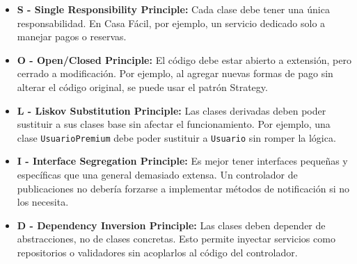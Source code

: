 		\begin{itemize}
			\item \textbf{S - Single Responsibility Principle:} Cada clase debe tener una única responsabilidad. En Casa Fácil, por ejemplo, un servicio dedicado solo a manejar pagos o reservas.
			
			\item \textbf{O - Open/Closed Principle:} El código debe estar abierto a extensión, pero cerrado a modificación. Por ejemplo, al agregar nuevas formas de pago sin alterar el código original, se puede usar el patrón Strategy.
			
			\item \textbf{L - Liskov Substitution Principle:} Las clases derivadas deben poder sustituir a sus clases base sin afectar el funcionamiento. Por ejemplo, una clase \texttt{UsuarioPremium} debe poder sustituir a \texttt{Usuario} sin romper la lógica.
			
			\item \textbf{I - Interface Segregation Principle:} Es mejor tener interfaces pequeñas y específicas que una general demasiado extensa. Un controlador de publicaciones no debería forzarse a implementar métodos de notificación si no los necesita.
			
			\item \textbf{D - Dependency Inversion Principle:} Las clases deben depender de abstracciones, no de clases concretas. Esto permite inyectar servicios como repositorios o validadores sin acoplarlos al código del controlador.
		\end{itemize}